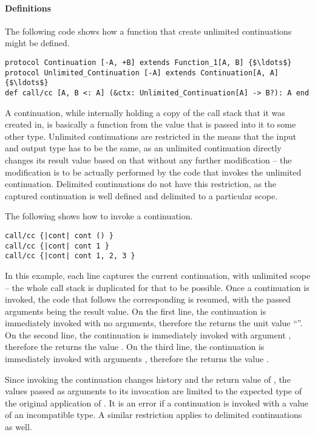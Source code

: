 \paragraph{Definitions}
The following code shows how a function that create unlimited continuations might be defined. 
\begin{lstlisting}
protocol Continuation [-A, +B] extends Function_1[A, B] {$\ldots$}
protocol Unlimited_Continuation [-A] extends Continuation[A, A] {$\ldots$}
def call/cc [A, B <: A] (&ctx: Unlimited_Continuation[A] -> B?): A end
\end{lstlisting}
A continuation, while internally holding a copy of the call stack that it was created in, is basically a function from the value that is passed into it to some other type. Unlimited continuations are restricted in the means that the input and output type has to be the same, as an unlimited continuation directly changes its result value based on that without any further modification -- the modification is to be actually performed by the code that invokes the unlimited continuation. Delimited continuations do not have this restriction, as the captured continuation is well defined and delimited to a particular scope. 

\example The following shows how to invoke a continuation. 
\begin{lstlisting}
call/cc {|cont| cont () }
call/cc {|cont| cont 1 }
call/cc {|cont| cont 1, 2, 3 }
\end{lstlisting}
In this example, each line captures the current continuation, with unlimited scope -- the whole call stack is duplicated for that to be possible. Once a continuation is invoked, the code that follows the corresponding  is resumed, with the passed arguments being the result value. On the first line, the continuation is immediately invoked with no arguments, therefore the  returns the unit value ``\code{()}''. On the second line, the continuation is immediately invoked with argument , therefore the  returns the value . On the third line, the continuation is immediately invoked with arguments , therefore the  returns the value . 

Since invoking the continuation changes history and the return value of , the values passed as arguments to its invocation are limited to the expected type of the original application of . It is an error if a continuation is invoked with a value of an incompatible type. A similar restriction applies to delimited continuations as well. 

